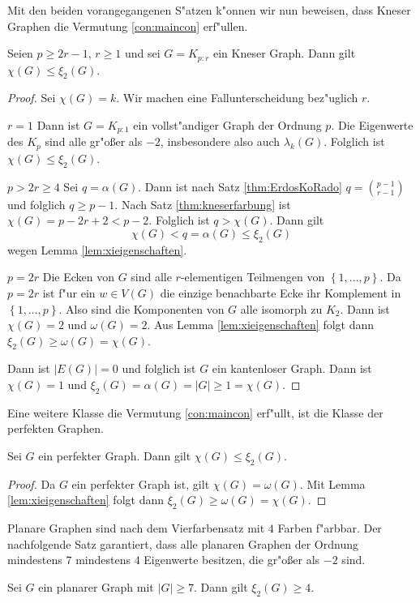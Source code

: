   Mit den beiden vorangegangenen S"atzen k"onnen wir nun beweisen, dass Kneser Graphen die Vermutung \ref{con:maincon} erf"ullen.
  \begin{proposition}
    Seien $p\geq 2r-1$, $r\geq 1$ und sei $G= K_{p:r}$ ein Kneser Graph. Dann gilt $\chi(G) \leq \xi_{2}(G)$. 
  \end{proposition}
  \begin{proof}
    Sei $\chi(G) = k$. Wir machen eine Fallunterscheidung bez"uglich $r$.

     {$r=1$} Dann ist $G=K_{p:1}$ ein vollst"andiger Graph der Ordnung $p$. Die Eigenwerte des $K_p$ sind alle gr"o{\ss}er als $-2$, insbesondere also auch $\lambda_{k}(G)$. Folglich ist $\chi(G) \leq \xi_{2}(G)$. 

     {$p > 2r \geq 4 $} Sei $q = \alpha(G)$.  Dann ist nach Satz \ref{thm:ErdosKoRado} $ q = \binom{p-1}{r-1}$ und folglich $ q \geq p-1$. Nach Satz \ref{thm:kneserfarbung} ist $\chi(G) = p-2r+2 < p-2$. Folglich ist $q > \chi(G)$. 
    Dann gilt $$\chi(G) < q = \alpha(G) \leq \xi_{2}(G) $$ wegen Lemma \ref{lem:xieigenschaften}.

     {$ p = 2r $} Die Ecken von $G$ sind alle $r$-elementigen Teilmengen von $\left\{ 1,\dots,p \right\}$. Da $p=2r$ ist f"ur ein $w\in V(G)$ die einzige benachbarte Ecke ihr Komplement in $\left\{ 1,\dots,p \right\}$. Also sind die Komponenten von $G$ alle isomorph zu $K_{2}$. Dann ist $\chi(G) = 2$ und $\omega(G) = 2$. 
    Aus Lemma \ref{lem:xieigenschaften} folgt dann $\xi_{2}(G) \geq \omega(G) = \chi(G)$.

     Dann ist $|E(G)| = 0$ und folglich ist $G$ ein kantenloser Graph. Dann ist $\chi(G) = 1$ und $\xi_{2}(G) = \alpha(G) = |G| \geq 1 = \chi(G)$.
  \end{proof}
  Eine weitere Klasse die Vermutung \ref{con:maincon} erf"ullt, ist die Klasse der perfekten Graphen.

  \begin{proposition}
    Sei $G$ ein perfekter Graph. Dann gilt 
    $\chi(G) \leq \xi_{2}(G)$.
  \end{proposition}

  \begin{proof}
    Da $G$ ein perfekter Graph ist, gilt $\chi(G) = \omega(G)$. 
    Mit Lemma \ref{lem:xieigenschaften} folgt dann $\xi_2(G) \geq \omega(G) = \chi(G)$.
  \end{proof}

  Planare Graphen sind nach dem Vierfarbensatz  mit $4$ Farben f"arbbar. Der nachfolgende Satz garantiert, dass alle planaren Graphen der Ordnung mindestens $7$ mindestens $4$ Eigenwerte besitzen, die gr"o{\ss}er als $-2$ sind.
  \begin{proposition}
    Sei $G$ ein planarer Graph mit $|G| \geq 7$. Dann gilt $\xi_{2}(G) \geq 4$.
    \label{prop:planaregraphen}
  \end{proposition}

